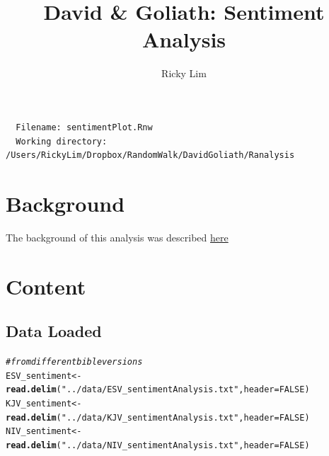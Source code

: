 \documentclass{article}\usepackage[]{graphicx}\usepackage[]{color}
\makeatletter
\newcommand{\hlnum}[1]{\textcolor[rgb]{0.686,0.059,0.569}{#1}}%
\newcommand{\hlstr}[1]{\textcolor[rgb]{0.192,0.494,0.8}{#1}}%
\newcommand{\hlcom}[1]{\textcolor[rgb]{0.678,0.584,0.686}{\textit{#1}}}%
\newcommand{\hlstd}[1]{\textcolor[rgb]{0.345,0.345,0.345}{#1}}%
\newcommand{\hlkwb}[1]{\textcolor[rgb]{0.69,0.353,0.396}{#1}}%
\newcommand{\hlkwc}[1]{\textcolor[rgb]{0.333,0.667,0.333}{#1}}%
\newcommand{\hlkwd}[1]{\textcolor[rgb]{0.737,0.353,0.396}{\textbf{#1}}}%
\newenvironment{kframe}{%
 \def\at@end@of@kframe{}%
 \ifinner\ifhmode%
  \def\at@end@of@kframe{\end{minipage}}%
  \begin{minipage}{\columnwidth}%
 \fi\fi%
 \def\FrameCommand##1{\hskip\@totalleftmargin \hskip-\fboxsep
 \colorbox{shadecolor}{##1}\hskip-\fboxsep
     \hskip-\linewidth \hskip-\@totalleftmargin \hskip\columnwidth}%
 \MakeFramed {\advance\hsize-\width
   \@totalleftmargin\z@ \linewidth\hsize
   \@setminipage}}%
 {\par\unskip\endMakeFramed%
 \at@end@of@kframe}
\newenvironment{knitrout}{}{} %
\makeatother
\begin{document}
\author{Ricky Lim}
\title{David \& Goliath: Sentiment Analysis}
\maketitle

\begin{verbatim}
  Filename: sentimentPlot.Rnw 
  Working directory: /Users/RickyLim/Dropbox/RandomWalk/DavidGoliath/Ranalysis 
\end{verbatim}

\section{Background}
The background of this analysis was described \href{https://github.com/rickylim19/DavidGoliath}{here}


\section{Content}
\subsection{Data Loaded}
\begin{knitrout}
\color{fgcolor}\begin{kframe}
\begin{alltt}
\hlcom{# from different bible versions}
\hlstd{ESV_sentiment} \hlkwb{<-} \hlkwd{read.delim}\hlstd{(}\hlstr{"../data/ESV_sentimentAnalysis.txt"}\hlstd{,} \hlkwc{header} \hlstd{=} \hlnum{FALSE}\hlstd{)}
\hlstd{KJV_sentiment} \hlkwb{<-} \hlkwd{read.delim}\hlstd{(}\hlstr{"../data/KJV_sentimentAnalysis.txt"}\hlstd{,} \hlkwc{header} \hlstd{=} \hlnum{FALSE}\hlstd{)}
\hlstd{NIV_sentiment} \hlkwb{<-} \hlkwd{read.delim}\hlstd{(}\hlstr{"../data/NIV_sentimentAnalysis.txt"}\hlstd{,} \hlkwc{header} \hlstd{=} \hlnum{FALSE}\hlstd{)}
\end{alltt}
\end{kframe}
\end{knitrout}
\end{document}
